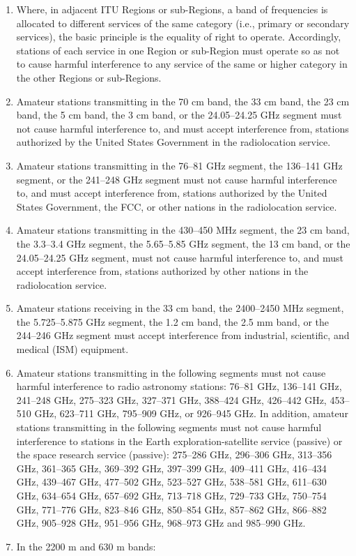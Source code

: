 \documentclass[
  letterpaper,
  DIV=11,
  numbers=noendperiod]{scrreport}
\begin{document}
\begin{enumerate}
\def\labelenumi{(\alph{enumi})}
\item
  Where, in adjacent ITU Regions or sub-Regions, a band of frequencies
  is allocated to different services of the same category (i.e., primary
  or secondary services), the basic principle is the equality of right
  to operate. Accordingly, stations of each service in one Region or
  sub-Region must operate so as not to cause harmful interference to any
  service of the same or higher category in the other Regions or
  sub-Regions.
\item
  Amateur stations transmitting in the 70 cm band, the 33 cm band, the
  23 cm band, the 5 cm band, the 3 cm band, or the 24.05--24.25 GHz
  segment must not cause harmful interference to, and must accept
  interference from, stations authorized by the United States Government
  in the radiolocation service.
\item
  Amateur stations transmitting in the 76--81 GHz segment, the 136--141
  GHz segment, or the 241--248 GHz segment must not cause harmful
  interference to, and must accept interference from, stations
  authorized by the United States Government, the FCC, or other nations
  in the radiolocation service.
\item
  Amateur stations transmitting in the 430--450 MHz segment, the 23 cm
  band, the 3.3--3.4 GHz segment, the 5.65--5.85 GHz segment, the 13 cm
  band, or the 24.05--24.25 GHz segment, must not cause harmful
  interference to, and must accept interference from, stations
  authorized by other nations in the radiolocation service.
\item
  Amateur stations receiving in the 33 cm band, the 2400--2450 MHz
  segment, the 5.725--5.875 GHz segment, the 1.2 cm band, the 2.5 mm
  band, or the 244--246 GHz segment must accept interference from
  industrial, scientific, and medical (ISM) equipment.
\item
  Amateur stations transmitting in the following segments must not cause
  harmful interference to radio astronomy stations: 76--81 GHz, 136--141
  GHz, 241--248 GHz, 275--323 GHz, 327--371 GHz, 388--424 GHz, 426--442
  GHz, 453--510 GHz, 623--711 GHz, 795--909 GHz, or 926--945 GHz. In
  addition, amateur stations transmitting in the following segments must
  not cause harmful interference to stations in the Earth
  exploration-satellite service (passive) or the space research service
  (passive): 275--286 GHz, 296--306 GHz, 313--356 GHz, 361--365 GHz,
  369--392 GHz, 397--399 GHz, 409--411 GHz, 416--434 GHz, 439--467 GHz,
  477--502 GHz, 523--527 GHz, 538--581 GHz, 611--630 GHz, 634--654 GHz,
  657--692 GHz, 713--718 GHz, 729--733 GHz, 750--754 GHz, 771--776 GHz,
  823--846 GHz, 850--854 GHz, 857--862 GHz, 866--882 GHz, 905--928 GHz,
  951--956 GHz, 968--973 GHz and 985--990 GHz.
\item
  In the 2200 m and 630 m bands:
\end{enumerate}
\end{document}

